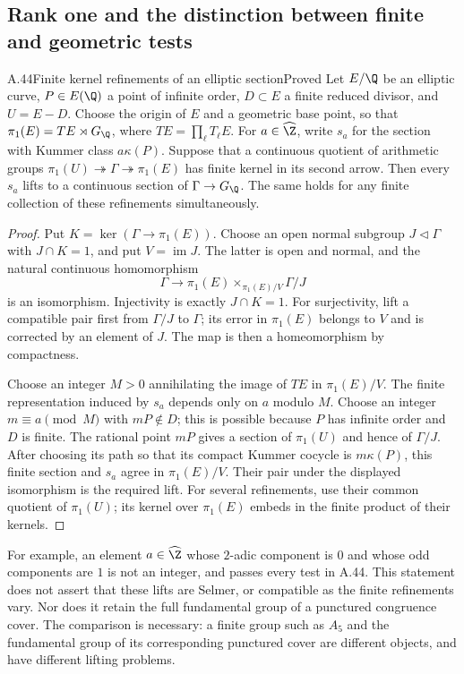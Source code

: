 \subsection{Rank one and the distinction between finite and geometric tests}
\begin{statement}{A.44}{Finite kernel refinements of an elliptic section}{Proved}
Let $E/\Q$ be an elliptic curve, $P\in E(\Q)$ a point of infinite order,
$D\subset E$ a finite reduced divisor, and $U=E-D$. Choose the origin of
$E$ and a geometric base point, so that
$\pi_1(E)=T E\rtimes G_\Q$, where $T E=\prod_\ell T_\ell E$.
For $a\in\widehat\Z$, write $s_a$ for the section with Kummer class
$a\kappa(P)$. Suppose that a continuous quotient of arithmetic groups
$\pi_1(U)\twoheadrightarrow\Gamma\twoheadrightarrow\pi_1(E)$
has finite kernel in its second arrow. Then every $s_a$ lifts to a
continuous section of $\Gamma\to G_\Q$. The same holds for any finite
collection of these refinements simultaneously.
\end{statement}
\begin{proof}
Put $K=\ker(\Gamma\to\pi_1(E))$. Choose an open normal subgroup
$J\triangleleft\Gamma$ with $J\cap K=1$, and put $V=\operatorname{im}J$.
The latter is open and normal, and the natural continuous homomorphism
\[
 \Gamma\longrightarrow
 \pi_1(E)\mathop{\times}_{\pi_1(E)/V}\Gamma/J
\]
is an isomorphism. Injectivity is exactly $J\cap K=1$. For surjectivity,
lift a compatible pair first from $\Gamma/J$ to $\Gamma$; its error in
$\pi_1(E)$ belongs to $V$ and is corrected by an element of $J$.
The map is then a homeomorphism by compactness.

Choose an integer $M>0$ annihilating the image of $T E$ in
$\pi_1(E)/V$. The finite representation induced by $s_a$ depends only
on $a$ modulo $M$. Choose an integer $m\equiv a\pmod M$ with $mP\notin D$;
this is possible because $P$ has infinite order and $D$ is finite.
The rational point $mP$ gives a section of $\pi_1(U)$ and hence of
$\Gamma/J$. After choosing its path so that its compact Kummer cocycle
is $m\kappa(P)$, this finite section and $s_a$ agree in $\pi_1(E)/V$.
Their pair under the displayed isomorphism is the required lift.
For several refinements, use their common quotient of $\pi_1(U)$;
its kernel over $\pi_1(E)$ embeds in the finite product of their kernels.
\end{proof}

For example, an element $a\in\widehat\Z$ whose $2$-adic component is
$0$ and whose odd components are $1$ is not an integer, and passes
every test in A.44. This statement does not assert that these lifts
are Selmer, or compatible as the finite refinements vary. Nor does
it retain the full fundamental group of a punctured congruence cover.
The comparison is necessary: a finite group such as $A_5$ and the
fundamental group of its corresponding punctured cover are different
objects, and have different lifting problems.

